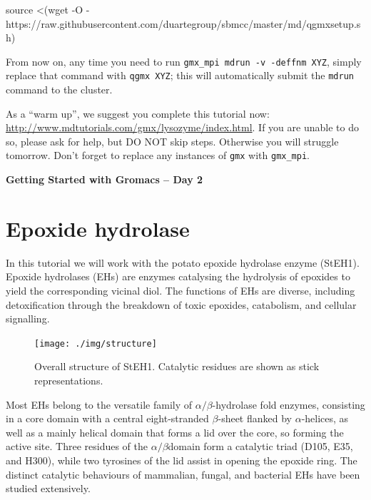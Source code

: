 \documentclass[10pt]{article}
\begin{document}
\begin{cmdline}
source <(wget -O - https://raw.githubusercontent.com/duartegroup/sbmcc/master/md/qgmxsetup.sh)
\end{cmdline}

From now on, any time you need to run \texttt{gmx\_mpi mdrun -v -deffnm XYZ}, simply replace that command with \texttt{qgmx XYZ}; this will automatically submit the \texttt{mdrun} command to the cluster.

As a ``warm up'', we suggest you complete this tutorial now: \url{http://www.mdtutorials.com/gmx/lysozyme/index.html}. If you are unable to do so, please ask for help, but DO NOT skip steps. Otherwise you will struggle tomorrow. Don't forget to replace any instances of \texttt{gmx} with \texttt{gmx\_mpi}.


\newpage\textbf{\LARGE Getting Started with Gromacs -- Day 2}

\section{Epoxide hydrolase}
In this tutorial we will work with the potato epoxide hydrolase enzyme (StEH1). Epoxide hydrolases (EHs) are enzymes catalysing the hydrolysis of epoxides to yield the corresponding vicinal diol.\autocite{Elfstrom2005} The functions of EHs are diverse, including detoxification through the breakdown of toxic epoxides, catabolism, and cellular signalling. 

\begin{figure}[H]
 \centering
 \texttt{[image: ./img/structure]}
 \caption{Overall structure of StEH1. Catalytic residues are shown as stick representations.}
\end{figure}

Most EHs belong to the versatile family of $\alpha/\beta$-hydrolase fold enzymes, consisting in a core domain with a central eight-stranded $\beta$-sheet flanked by $\alpha$-helices, as well as a mainly helical domain that forms a lid over the core, so forming the active site. Three residues of the $\alpha/\beta$domain form a catalytic triad (D105, E35, and H300), while two tyrosines of the lid assist in opening the epoxide ring. The distinct catalytic behaviours of mammalian, fungal, and bacterial EHs have been studied extensively.\autocite{Morisseau2005}
\end{document}
